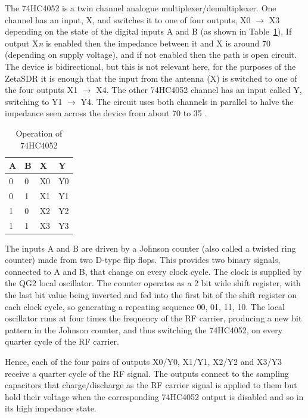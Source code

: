 \documentclass[11pt, twoside]{article}
\begin{document}
The 74HC4052 is a twin channel analogue multiplexer/demultiplexer.
One channel has an input, X, and switches it to one of four outputs,
X0 $\rightarrow$ X3 depending on the state of the digital inputs A and
B (as shown in Table~\ref{table:74HC4052}).  If output X{\it n} is
enabled then the impedance between it and X is around 70 {\ohm}
(depending on supply voltage), and if not enabled then the path is
open circuit.  The device is bidirectional, but this is not relevant
here, for the purposes of the ZetaSDR it is enough that the input from
the antenna (X) is switched to one of the four outputs X1
$\rightarrow$ X4. The other 74HC4052 channel has an input called Y,
switching to Y1 $\rightarrow$ Y4.  The circuit uses both channels in
parallel to halve the impedance seen across the device from about 70
{\ohm} to 35 {\ohm}.

\begin{table}[ht]
  \center
  \begin{tabular}{|l| l| l| l|}
    \hline
    A & B & X & Y  \\
    \hline
    \hline
    0 &0& X0& Y0\\
    0 &1& X1& Y1\\
    1 &0& X2& Y2\\
    1 &1& X3& Y3\\
    \hline
  \end{tabular}
  \caption{Operation of 74HC4052}
  \label{table:74HC4052}
\end{table}

The inputs A and B are driven by a Johnson counter (also called a
twisted ring counter) made from two D-type flip flops.  This provides
two binary signals, connected to A and B, that change on every clock
cycle.  The clock is supplied by the QG2 local oscillator. The counter
operates as a 2 bit wide shift register, with the last bit value
being inverted and fed into the first bit of the shift register on
each clock cycle, so generating a repeating sequence 00, 01, 11, 10.
The local oscillator runs at four times the frequency of the RF
carrier, producing a new bit pattern in the Johnson counter, and thus
switching the 74HC4052, on every quarter cycle of the RF carrier.

Hence, each of the four pairs of outputs X0/Y0, X1/Y1, X2/Y2 and X3/Y3
receive a quarter cycle of the RF signal.  The outputs connect to the
sampling capacitors that charge/discharge as the RF carrier signal is
applied to them but hold their voltage when the corresponding 74HC4052
output is disabled and so in its high impedance state.
\end{document}
